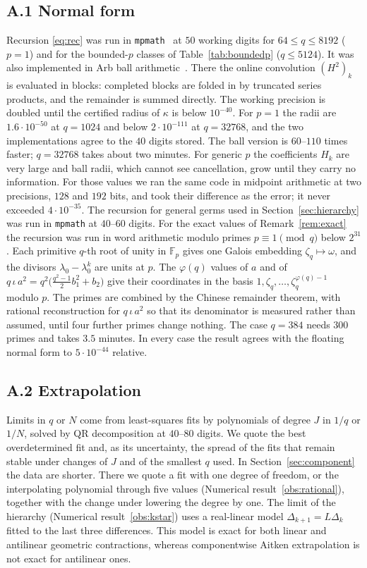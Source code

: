 \documentclass[11pt]{amsart}
\theoremstyle{definition}
\theoremstyle{remark}
\begin{document}
\subsection*{A.1 Normal form}
Recursion \eqref{eq:rec} was run in \texttt{mpmath}~\cite{mpmath} at $50$ working digits for $64\le q\le8192$ ($p=1$) and for the bounded-$p$ classes of Table~\ref{tab:boundedp} ($q\le5124$). It was also implemented in Arb ball arithmetic~\cite{Arb}. There the online convolution $(H^2)_k$ is evaluated in blocks: completed blocks are folded in by truncated series products, and the remainder is summed directly. The working precision is doubled until the certified radius of $\kappa$ is below $10^{-40}$. For $p=1$ the radii are $1.6\cdot10^{-50}$ at $q=1024$ and below $2\cdot10^{-111}$ at $q=32768$, and the two implementations agree to the $40$ digits stored. The ball version is $60$--$110$ times faster; $q=32768$ takes about two minutes. For generic $p$ the coefficients $H_k$ are very large and ball radii, which cannot see cancellation, grow until they carry no information. For those values we ran the same code in midpoint arithmetic at two precisions, $128$ and $192$ bits, and took their difference as the error; it never exceeded $4\cdot10^{-35}$. The recursion for general germs used in Section~\ref{sec:hierarchy} was run in \texttt{mpmath} at $40$--$60$ digits. For the exact values of Remark~\ref{rem:exact} the recursion was run in word arithmetic modulo primes $p\equiv1\pmod q$ below $2^{31}$. Each primitive $q$-th root of unity in $\mathbb F_p$ gives one Galois embedding $\zeta_q\mapsto\omega$, and the divisors $\lambda_0-\lambda_0^k$ are units at $p$. The $\varphi(q)$ values of $a$ and of $q\,\iota\,a^2=q^2\bigl(\frac{q^2-1}2b_1^2+b_2\bigr)$ give their coordinates in the basis $1,\zeta_q,\ldots,\zeta_q^{\varphi(q)-1}$ modulo $p$. The primes are combined by the Chinese remainder theorem, with rational reconstruction for $q\,\iota\,a^2$ so that its denominator is measured rather than assumed, until four further primes change nothing. The case $q=384$ needs $300$ primes and takes $3.5$ minutes. In every case the result agrees with the floating normal form to $5\cdot10^{-44}$ relative.

\subsection*{A.2 Extrapolation}
Limits in $q$ or $N$ come from least-squares fits by polynomials of degree $J$ in $1/q$ or $1/N$, solved by QR decomposition at $40$--$80$ digits. We quote the best overdetermined fit and, as its uncertainty, the spread of the fits that remain stable under changes of $J$ and of the smallest $q$ used. In Section~\ref{sec:component} the data are shorter. There we quote a fit with one degree of freedom, or the interpolating polynomial through five values (Numerical result~\ref{obs:rational}), together with the change under lowering the degree by one. The limit of the hierarchy (Numerical result~\ref{obs:kstar}) uses a real-linear model $\Delta_{k+1}=L\Delta_k$ fitted to the last three differences. This model is exact for both linear and antilinear geometric contractions, whereas componentwise Aitken extrapolation is not exact for antilinear ones.
\end{document}
